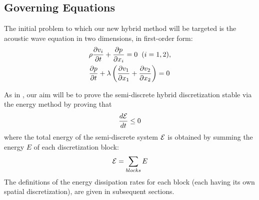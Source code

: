 
\subsection{Governing Equations}

The initial problem to which our new hybrid method will be targeted is
the acoustic wave equation in two dimensions, in first-order form:
\begin{align}
	&\rho \frac{\partial v_{i}}{\partial t} + \frac{\partial p}{\partial x_{i}} = 0 \hspace{2mm} (i = 1, 2), \label{eq:wave1} \\
	&\frac{\partial p}{\partial t} + \lambda \left(\frac{\partial v_{1}}{\partial x_{1}} + \frac{\partial v_{2}}{\partial x_{2}} \right) = 0 \label{eq:wave2}
\end{align}

As in \cite{kozdon2016stable}, our aim will be to prove the semi-discrete hybrid discretization
stable via the energy method by proving that
\begin{align}
\frac{d\mathcal{E}}{dt} \leq 0
\end{align}
where the total energy of the semi-discrete system $\mathcal{E}$ is obtained by summing the
energy $E$ of each discretization block:
\begin{align}
\mathcal{E} = \sum_{blocks} E
\end{align}
The definitions of the energy dissipation rates for each
block (each having its own spatial discretization), are given in subsequent
sections.

